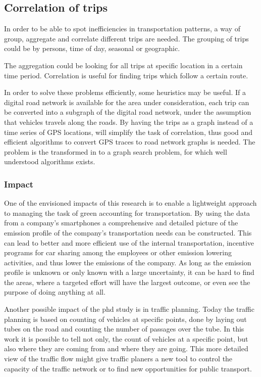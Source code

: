 \subsection{Correlation of trips}
In order to be able to spot inefficiencies in transportation patterns, a way of group, aggregate and correlate different trips are needed. The grouping of trips could be by persons, time of day, seasonal or geographic. 

The aggregation could be looking for all trips at specific location in a certain time period. Correlation is useful for finding trips which follow a certain route.

In order to solve these problems efficiently, some heuristics may be useful. If a digital road network is available for the area under consideration, each trip can be converted into a subgraph of the  digital road network, under the assumption that vehicles travels along the roads. By having the trips as a graph instead of a time series of GPS locations, will simplify the task of correlation, thus good and efficient algorithms to convert GPS traces to road network graphs is needed. The problem is the transformed in to a graph search problem, for which well understood algorithms exists.

\subsubsection{Impact}
One of the envisioned impacts of this research is to enable a lightweight approach to managing the task of green accounting for transportation. By using the data from a company's smartphones a comprehensive and detailed picture of the emission profile of the company's transportation needs can be constructed. This can lead to better and more efficient use of the internal transportation, incentive programs for car sharing among the employees or other emission lowering activities, and thus lower the emissions of the company. As long as the emission profile is unknown or only known with a large uncertainty, it can be hard to find the areas, where a targeted effort will have the largest outcome, or even see the purpose of doing anything at all.

Another possible impact of the phd study is in traffic planning. Today the traffic planning is based on counting of vehicles at specific points, done by laying out tubes on the road and counting the number of passages over the tube. In this work it is possible to tell not only, the count of vehicles at a specific point, but also where they are coming from and where they are going. This more detailed view of the traffic flow might give traffic planers a new tool to control the capacity of the traffic network or to find new opportunities for public transport.

